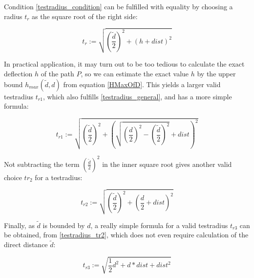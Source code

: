 Condition \ref{testradius_condition} can be fulfilled with equality by choosing a radius $t_{r}$ as the square root of the right side:

\begin{equation}
 \label{testradius_general}
 t_r  := \sqrt{\left(\frac{\tilde{d}}{2}\right)^2 + \left(h+dist\right)^2}
\end{equation}

In practical application, it may turn out to be too tedious to calculate the exact deflection $h$ of 
the path $P$, so we can estimate the exact value $h$ by the upper bound $h_{max}(\tilde{d},d)$ 
from equation \ref{HMaxOfD}. 
This yields a larger valid testradius $t_{r1}$, which also fulfills \ref{testradius_general},
and has a more simple formula:   

\begin{equation}
 \label{testradius_tr1}
  t_{r1} := \sqrt{\left(\frac{\tilde{d}}{2}\right)^2 + \left(\sqrt{ \left(\frac{d}{2}\right)^2 - \left(\frac{\tilde{d}}{2}\right)^2 }+dist\right)^2}
\end{equation}

Not subtracting the term $\left( \frac{\tilde{d}}{2}\right)^2$ in the inner square root gives another  
valid choice $tr_2$ for a testradius:   

\begin{equation}
 \label{testradius_tr2}
  t_{r2} := \sqrt{\left(\frac{\tilde{d}}{2}\right)^2 + \left(\frac{d}{2}+dist\right)^2}
\end{equation}

Finally, as $ \tilde{d}$ is bounded by $ d $, a really simple formula for a valid
testradius $t_{r3}$  can be obtained, from  \ref{testradius_tr2},  
which does not even require calculation of the direct distance $\tilde{d}$:

\begin{equation}
 \label{testradius_tr3}
 t_{r3}  := \sqrt{ \frac{1}{2}d^2 + d*dist + dist^2}
\end{equation}


